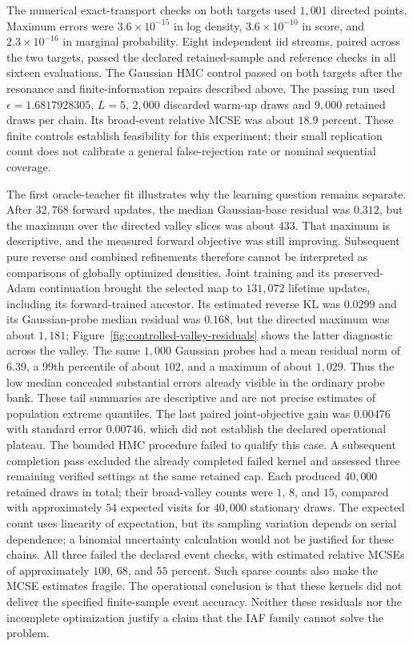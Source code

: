 The numerical exact-transport checks on both targets used $1{,}001$ directed
points. Maximum errors were $3.6\times10^{-15}$ in log density,
$3.6\times10^{-10}$ in score, and $2.3\times10^{-16}$ in marginal probability.
Eight independent iid streams, paired across the two targets, passed the
declared retained-sample and reference checks in all sixteen evaluations.
The Gaussian HMC control passed on both targets after the resonance and
finite-information repairs described above. The passing run used
$\epsilon=1.6817928305$, $L=5$, $2{,}000$ discarded warm-up draws and
$9{,}000$ retained draws per chain. Its broad-event relative MCSE was about
$18.9$ percent. These finite controls establish feasibility for this
experiment; their small replication count does not calibrate a general
false-rejection rate or nominal sequential coverage.

The first oracle-teacher fit illustrates why the learning question remains
separate. After $32{,}768$ forward updates, the median Gaussian-base residual
was $0.312$, but the maximum over the directed valley slices was about $433$.
That maximum is descriptive, and the measured forward objective was still
improving. Subsequent pure reverse and combined refinements therefore cannot
be interpreted as comparisons of globally optimized densities. Joint training
and its preserved-Adam continuation brought the selected map to $131{,}072$
lifetime updates, including its forward-trained ancestor. Its estimated reverse
KL was $0.0299$ and its Gaussian-probe median residual was $0.168$, but the
directed maximum was about $1{,}181$; Figure~\ref{fig:controlled-valley-residuals}
shows the latter diagnostic across the valley. The same $1{,}000$ Gaussian
probes had a mean residual norm of $6.39$, a 99th percentile of about $102$,
and a maximum of about $1{,}029$. Thus the low median concealed substantial
errors already visible in the ordinary probe bank. These tail summaries are
descriptive and are not precise estimates of population extreme quantiles.
The last paired joint-objective
gain was $0.00476$ with standard error $0.00746$, which did not establish the
declared operational plateau. The bounded HMC procedure failed to qualify this
case. A subsequent completion pass excluded the already completed failed
kernel and assessed three remaining verified settings at the same retained
cap. Each produced $40{,}000$ retained draws in total; their broad-valley
counts were $1$, $8$, and $15$, compared with approximately $54$ expected
visits for $40{,}000$ stationary draws. The expected count uses linearity of
expectation, but its sampling variation depends on serial dependence; a
binomial uncertainty calculation would not be justified for these chains.
All three failed the declared event checks, with estimated relative MCSEs
of approximately $100$, $68$, and $55$ percent. Such sparse counts also make
the MCSE estimates fragile. The operational conclusion is that these kernels
did not deliver the specified finite-sample event accuracy. Neither these
residuals nor the incomplete optimization justify a claim
that the IAF family cannot solve the problem.

